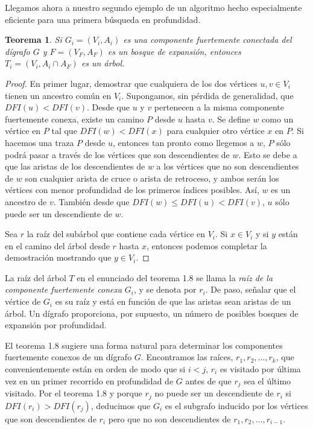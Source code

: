 \documentclass[10pt,a5paper]{book}
\newtheorem{teorema}{Teorema}[chapter]
\begin{document}
Llegamos ahora a nuestro segundo ejemplo de un algoritmo hecho especialmente eficiente para una primera búsqueda en profundidad.

\begin{teorema}
Si $G_i = (V_i, A_i)$ es una componente fuertemente conectada del dígrafo $G$ y $F = (V_F,A_F)$ es un bosque de expansión, entonces $T_i = (V_i, A_i \cap A_F)$ es un árbol.
\end{teorema}
\begin{proof}
En primer lugar, demostrar que cualquiera de los dos vértices $u,v \in V_i$ tienen un ancestro común en $V_i$. Supongamos, sin pérdida de generalidad, que $DFI(u) < DFI(v)$. Desde que $u$ y $v$ pertenecen a la misma componente fuertemente conexa, existe un camino $P$ desde $u$ hasta $v$. Se define $w$ como un vértice en $P$ tal que $DFI(w) < DFI(x)$ para cualquier otro vértice $x$ en $P$. Si hacemos una traza $P$ desde $u$, entonces tan pronto como llegemos a $w$, $P$ sólo podrá pasar a través de los vértices que son descendientes de $w$. Esto se debe a que las aristas de los descendientes de $w$ a los vértices que no son descendientes de $w$ son cualquier arista de cruce o arista de retroceso, y ambos serán los vértices con menor profundidad de los primeros índices posibles. Así, $w$ es un ancestro de $v$. También desde que $DFI(w) \le DFI(u) < DFI(v)$, $u$ sólo puede ser un descendiente de $w$.

Sea $r$ la raíz del subárbol que contiene cada vértice en $V_i$. Si $x \in V_i$ y si $y$ están en el camino del árbol desde $r$ hasta $x$, entonces podemos completar la demostración mostrando que $y \in V_i$.
\end{proof}

La raíz del árbol $T$ en el enunciado del teorema 1.8 se llama la \emph{raíz de la componente fuertemente conexa} $G_i$, y se denota por $r_i$. De paso, señalar que el vértice de $G_i$ es su raíz y está en función de que las aristas sean aristas de un árbol. Un dígrafo proporciona, por supuesto, un número de posibles bosques de expansión por profundidad.

El teorema 1.8 sugiere una forma natural para determinar los componentes fuertemente conexos de un dígrafo $G$. Encontramos las raíces, $r_1, r_2, \ldots, r_k$, que convenientemente están en orden de modo que si $i < j$, $r_i$ es visitado por última vez en un primer recorrido en profundidad de $G$ antes de que $r_j$ sea el último visitado. Por el teorema 1.8 y porque $r_j$ no puede ser un descendiente de $r_i$ si $DFI(r_i) > DFI(r_j)$, deducimos que $G_i$ es el subgrafo inducido por los vértices que son descendientes de $r_i$ pero que no son descendientes de $r_1, r_2, \ldots, r_{i-1}$.
\end{document}
